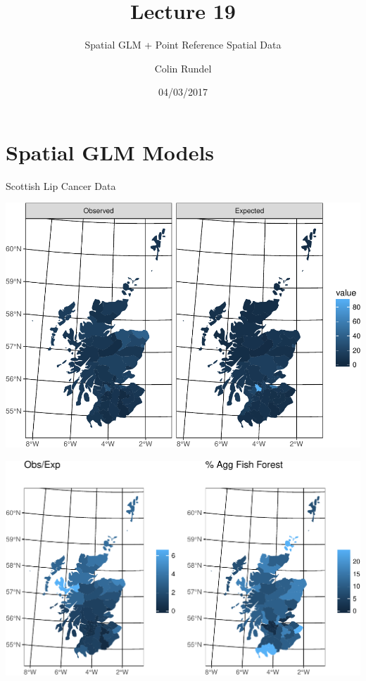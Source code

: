 \documentclass[11pt,ignorenonframetext,]{beamer}
\title{Lecture 19}
\subtitle{Spatial GLM + Point Reference Spatial Data}
\author{Colin Rundel}
\date{04/03/2017}
\begin{document}
\frame{\titlepage}

\hypertarget{spatial-glm-models}{%
\section{Spatial GLM Models}\label{spatial-glm-models}}

\begin{frame}{Scottish Lip Cancer Data}
\protect\hypertarget{scottish-lip-cancer-data}{}

\begin{center}\includegraphics[width=\textwidth]{Lec19_files/figure-beamer/unnamed-chunk-1-1} \end{center}

\end{frame}

\begin{frame}{}
\protect\hypertarget{section}{}

\begin{center}\includegraphics[width=\textwidth]{Lec19_files/figure-beamer/unnamed-chunk-2-1} \end{center}

\end{frame}
\end{document}
